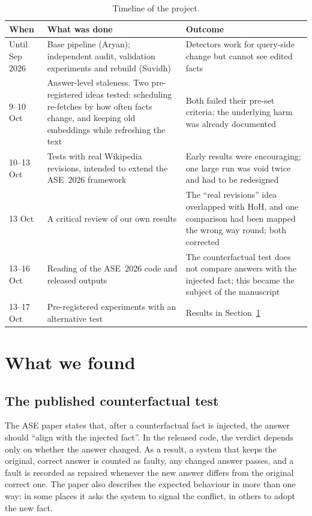 \documentclass[11pt,a4paper]{article}
\begin{document}
\begin{table}[h]
\centering
\small
\caption{Timeline of the project.}
\label{tab:timeline}
\begin{tabularx}{\linewidth}{@{}l X X@{}}
\toprule
When & What was done & Outcome \\
\midrule
Until Sep 2026 & Base pipeline (Aryan); independent audit, validation experiments and rebuild (Suvidh) & Detectors work for query-side change but cannot see edited facts \\
9--10 Oct & Answer-level staleness. Two pre-registered ideas tested: scheduling re-fetches by how often facts change, and keeping old embeddings while refreshing the text & Both failed their pre-set criteria; the underlying harm was already documented \\
10--13 Oct & Tests with real Wikipedia revisions, intended to extend the ASE~2026 framework & Early results were encouraging; one large run was void twice and had to be redesigned \\
13 Oct & A critical review of our own results & The ``real revisions'' idea overlapped with HoH, and one comparison had been mapped the wrong way round; both corrected \\
13--16 Oct & Reading of the ASE~2026 code and released outputs & The counterfactual test does not compare answers with the injected fact; this became the subject of the manuscript \\
13--17 Oct & Pre-registered experiments with an alternative test & Results in Section~\ref{sec:results} \\
\bottomrule
\end{tabularx}
\end{table}

\section{What we found}
\label{sec:results}

\subsection*{The published counterfactual test}
The ASE paper states that, after a counterfactual fact is injected, the answer should ``align with
the injected fact''. In the released code, the verdict depends only on whether the answer changed.
As a result, a system that keeps the original, correct answer is counted as faulty, any changed answer
passes, and a fault is recorded as repaired whenever the new answer differs from the original correct
one. The paper also describes the expected behaviour in more than one way: in some places it asks
the system to signal the conflict, in others to adopt the new fact.
\end{document}
